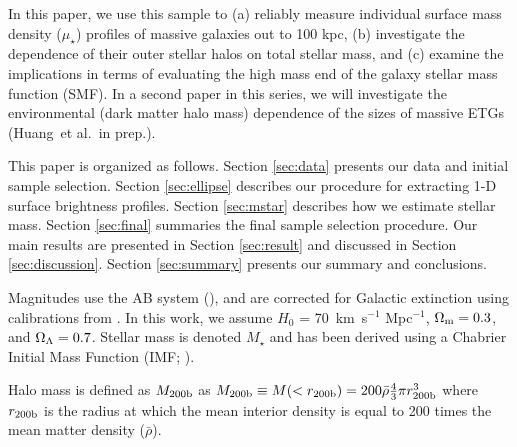 \documentclass[a4paper,fleqn,usenatbib]{mnras}
\def\etal{{\ et al.~}}
\def\redm{\texttt{redMaPPer}}
\def\mstar{{$M_{\star}$}}
\def\mden{{$\mu_{\star}$}}
\begin{document}
    
    In this paper, we use this sample to 
    (a) reliably measure individual surface mass density (\mden{}) profiles of 
    massive galaxies out to 100 kpc, 
    (b) investigate the dependence of their outer stellar halos on total stellar 
    mass, and 
    (c) examine the implications in terms of evaluating the high mass end of the 
    galaxy stellar mass function (SMF). 
    In a second paper in this series, we will investigate the environmental 
    (dark matter halo mass) dependence of the sizes of massive ETGs 
    (Huang\etal in prep.).
    
    This paper is organized as follows. 
    Section \ref{sec:data} presents our data and initial sample selection. 
    Section \ref{sec:ellipse} describes our procedure for extracting 1-D surface 
    brightness profiles. 
    Section \ref{sec:mstar} describes how we estimate stellar mass.
    Section \ref{sec:final} summaries the final sample selection procedure. 
    Our main results are presented in Section \ref{sec:result} and discussed in 
    Section \ref{sec:discussion}. 
    Section \ref{sec:summary} presents our summary and conclusions.

    Magnitudes use the AB system (\citealt{Oke1983}), and are corrected for Galactic 
    extinction using calibrations from \citet{Schlafly11}.
    In this work, we assume $H_0$ = 70~km~s$^{-1}$ Mpc$^{-1}$, ${\Omega}_{\rm m}=0.3$, 
    and ${\Omega}_{\rm \Lambda}=0.7$.
    Stellar mass is denoted \mstar{} and has been derived using a Chabrier Initial Mass 
    Function (IMF; \citealt{Chabrier2003}).   
      
    Halo mass is defined as $M_{\rm 200b}$ as 
    $M_{\rm 200b}\equiv M(<r_{\rm 200b})=200\bar{\rho} 
    \frac{4}{3}\pi r_{\rm 200b}^3$ where $r_{\rm 200b}$
    is the radius at which the mean interior density is equal to 200 times
    the mean matter density ($\bar{\rho}$). 
    
\end{document}
